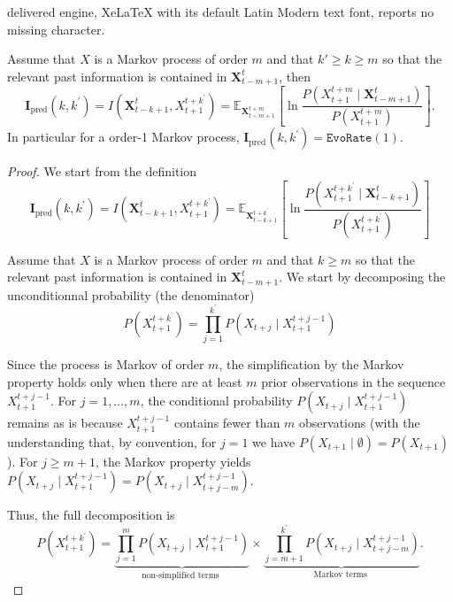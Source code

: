 \documentclass[10pt,a4paper]{amsart}
\begin{document}
delivered engine, XeLaTeX with its default Latin Modern text font, reports no missing character.
\begin{proposition}\label{prop:value_of_evoPred_for_markovian_process}
Assume that $X$ is a Markov process of order $m$ and that $k'\geq k \geq m$ so that the relevant past information is contained in $\mathbf{X}_{t-m+1}^t$, then 
$$\mathbf{I}_{\text{pred}}\left(k, k^{\prime}\right)=I\left(\mathbf{X}_{t-k+1}^t, X_{t+1}^{t+k^{\prime}}\right)=\mathbb{E}_{\mathbf{X}_{t-m+1}^{t+m}}\left[\ln \frac{P\left(X_{t+1}^{t+m} \mid \mathbf{X}_{t-m+1}^t\right)}{P\left(X_{t+1}^{t+m}\right)}\right].$$
In particular for a order-1 Markov process, $\mathbf{I}_{\text{pred}}\left(k, k^{\prime}\right) = \texttt{EvoRate}(1)$.
\end{proposition}

\begin{proof}

We start from the definition 
$$
\mathbf{I}_{\text{pred}}\left(k, k^{\prime}\right)=I\left(\mathbf{X}_{t-k+1}^t, X_{t+1}^{t+k^{\prime}}\right)=\mathbb{E}_{\mathbf{X}_{t-k+1}^{t+k^{\prime}}}\left[\ln \frac{P\left(X_{t+1}^{t+k^{\prime}} \mid \mathbf{X}_{t-k+1}^t\right)}{P\left(X_{t+1}^{t+k^{\prime}}\right)}\right]
$$

Assume that $X$ is a Markov process of order $m$ and that $k \geq m$ so that the relevant past information is contained in $\mathbf{X}_{t-m+1}^t$. We start by decomposing the unconditionnal probability (the denominator)
$$
P\left(X_{t+1}^{t+k^{\prime}}\right)=\prod_{j=1}^{k^{\prime}} P\left(X_{t+j} \mid X_{t+1}^{t+j-1}\right)
$$

Since the process is Markov of order $m$, the simplification by the Markov property holds only when there are at least $m$ prior observations in the sequence $X_{t+1}^{t+j-1}$. For $j=1, \ldots, m$, the conditional probability $P\left(X_{t+j} \mid X_{t+1}^{t+j-1}\right)$ remains as is because $X_{t+1}^{t+j-1}$ contains fewer than $m$ observations (with the understanding that, by convention, for $j=1$ we have $P\left(X_{t+1} \mid \emptyset\right)=P\left(X_{t+1}\right)$ ). For $j \geq m+1$, the Markov property yields $P\left(X_{t+j} \mid X_{t+1}^{t+j-1}\right)=P\left(X_{t+j} \mid X_{t+j-m}^{t+j-1}\right) .$


Thus, the full decomposition is
\begin{equation}\label{eq:denominator_term_simplification}
P\left(X_{t+1}^{t+k^{\prime}}\right)=\underbrace{\prod_{j=1}^m P\left(X_{t+j} \mid X_{t+1}^{t+j-1}\right)}_{\text {non-simplified terms }} \times \underbrace{\prod_{j=m+1}^{k^{\prime}} P\left(X_{t+j} \mid X_{t+j-m}^{t+j-1}\right)}_{\text {Markov terms }} .
\end{equation}


\end{proof}
\end{document}
